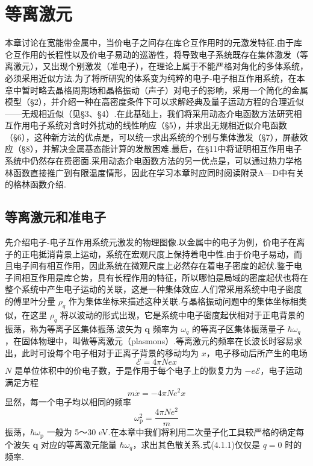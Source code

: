 \chapter{等离激元}

本章讨论在宽能带金属中，当价电子之间存在库仑互作用时的元激发特征.由于库仑互作用的长程性以及价电子易动的巡游性，将导致电子系统既存在集体激发（等离激元），又出现个别激发（准电子），在理论上属于不能严格对角化的多体系统，必须采用近似方法.为了将所研究的体系变为纯粹的电子-电子相互作用系统，在本章中暂时略去晶格周期场和晶格振动（声子）对电子的影响，采用一个简化的金属模型（§2），并介绍一种在高密度条件下可以求解经典及量子运动方程的合理近似——无规相近似（见§3、§4）.在此基础上，我们将采用动态介电函数方法研究相互作用电子系统对含时外扰动的线性响应（§5），并求出无规相近似介电函数（§6），这种新方法的优点是，可以统一求出系统的个别与集体激发（§7），屏蔽效应（§8），并解决金属基态能计算的发散困难.最后，在§11中将证明相互作用电子系统中仍然存在费密面.采用动态介电函数方法的另一优点是，可以通过热力学格林函数直接推广到有限温度情形，因此在学习本章时应同时阅读附录A—D中有关的格林函数介绍.

\section{等离激元和准电子}

先介绍电子-电子互作用系统元激发的物理图像.以金属中的电子为例，价电子在离子的正电抵消背景上运动，系统在宏观尺度上保持着电中性.由于价电子易动，而且电子间有相互作用，因此系统在微观尺度上必然存在着电子密度的起伏.鉴于电子间相互作用是库仑势，具有长程作用的特征，所以哪怕是局域的密度起伏也将在整个系统中产生电子运动的关联，这是一种集体效应.人们常采用系统中电子密度的傅里叶分量 $\rho_{q}$ 作为集体坐标来描述这种关联.与晶格振动问题中的集体坐标相类似，在这里 $\rho_{q}$ 将以波动的形式出现，它是系统中电子密度起伏相对于正电背景的振荡，称为等离子区集体振荡.波矢为 $\boldsymbol{q}$ 频率为 $\omega_{q}$ 的等离子区集体振荡量子 $\hbar\omega_{q}$，在固体物理中，叫做等离激元（plasmons）.等离激元的频率在长波长时容易求出，此时可设每个电子相对于正离子背景的移动均为 $x$，电子移动后所产生的电场
\begin{equation*}
  \mathcal{E}=4\pi Nex
\end{equation*}
$N$ 是单位体积中的价电子数，于是作用于每个电子上的恢复力为 $-e\mathcal{E}$，电子运动满足方程
\begin{equation*}
  m\ddot{x}=-4\pi Ne^{2}x
\end{equation*}
显然，每一个电子均以相同的频率
\begin{equation}
  \omega_{\mathrm{p}}^{2}=\frac{4\pi Ne^{2}}{m}
\end{equation}
振荡，$\hbar\omega_{\mathrm{p}}$ 一般为 5～30 eV.在本章中我们将利用二次量子化工具较严格的确定每个波矢 $\boldsymbol{q}$ 对应的等离激元能量 $\hbar\omega_{q}$，求出其色散关系.式(4.1.1)仅仅是 $q=0$ 时的频率.

